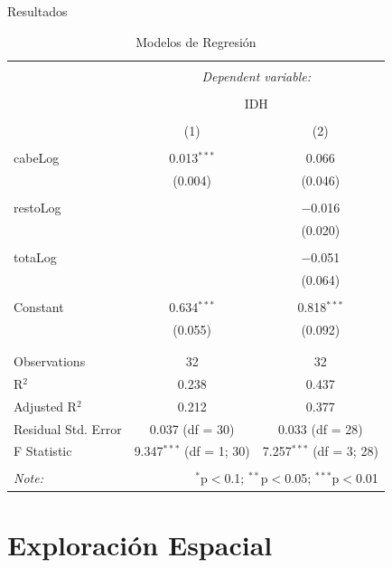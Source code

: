 \documentclass{article}
\begin{document}
Resultados
\begin{table}[!htbp] \centering 
  \caption{Modelos de Regresión} 
  \label{regresiones} 
\begin{tabular}{@{\extracolsep{5pt}}lcc} 
\\[-1.8ex]\hline 
\hline \\[-1.8ex] 
 & \multicolumn{2}{c}{\textit{Dependent variable:}} \\ 
\cline{2-3} 
\\[-1.8ex] & \multicolumn{2}{c}{IDH} \\ 
\\[-1.8ex] & (1) & (2)\\ 
\hline \\[-1.8ex] 
 cabeLog & 0.013$^{***}$ & 0.066 \\ 
  & (0.004) & (0.046) \\ 
  & & \\ 
 restoLog &  & $-$0.016 \\ 
  &  & (0.020) \\ 
  & & \\ 
 totaLog &  & $-$0.051 \\ 
  &  & (0.064) \\ 
  & & \\ 
 Constant & 0.634$^{***}$ & 0.818$^{***}$ \\ 
  & (0.055) & (0.092) \\ 
  & & \\ 
\hline \\[-1.8ex] 
Observations & 32 & 32 \\ 
R$^{2}$ & 0.238 & 0.437 \\ 
Adjusted R$^{2}$ & 0.212 & 0.377 \\ 
Residual Std. Error & 0.037 (df = 30) & 0.033 (df = 28) \\ 
F Statistic & 9.347$^{***}$ (df = 1; 30) & 7.257$^{***}$ (df = 3; 28) \\ 
\hline 
\hline \\[-1.8ex] 
\textit{Note:}  & \multicolumn{2}{r}{$^{*}$p$<$0.1; $^{**}$p$<$0.05; $^{***}$p$<$0.01} \\ 
\end{tabular} 
\end{table} 
 \clearpage
 
\section{Exploración Espacial}
\end{document}
